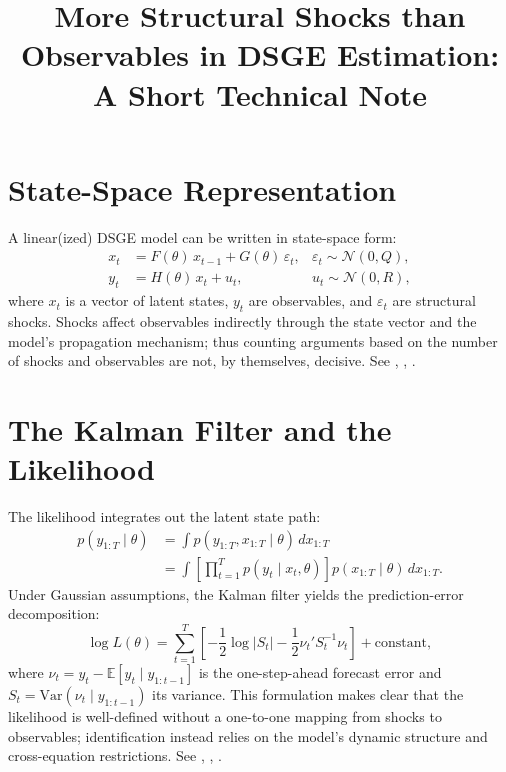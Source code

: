 \documentclass[11pt]{article}
\title{More Structural Shocks than Observables in DSGE Estimation: A Short Technical Note}
\author{}
\date{}
\begin{document}
\maketitle

\section{State-Space Representation}

A linear(ized) DSGE model can be written in state-space form:
\begin{align}
x_t &= F(\theta)\, x_{t-1} + G(\theta)\, \varepsilon_t, 
& \varepsilon_t \sim \mathcal{N}(0,Q), \label{eq:transition}\\
y_t &= H(\theta)\, x_t + u_t,
& u_t \sim \mathcal{N}(0,R), \label{eq:measurement}
\end{align}
where $x_t$ is a vector of latent states, $y_t$ are observables, and $\varepsilon_t$ are structural shocks.
Shocks affect observables indirectly through the state vector and the model's propagation mechanism; thus counting
arguments based on the number of shocks and observables are not, by themselves, decisive. See \citet{an2007},
\citet{herbst2015}, \citet{durbin2012}.

\section{The Kalman Filter and the Likelihood}

The likelihood integrates out the latent state path:
\begin{align}
p(y_{1:T}\mid \theta)
&= \int p(y_{1:T},x_{1:T}\mid \theta)\, dx_{1:T} \nonumber\\
&= \int \left[\prod_{t=1}^T p(y_t\mid x_t,\theta)\right] p(x_{1:T}\mid \theta)\, dx_{1:T}. \label{eq:likelihood_integral}
\end{align}
Under Gaussian assumptions, the Kalman filter yields the prediction-error decomposition:
\begin{equation}
\log L(\theta)
= \sum_{t=1}^{T} \left[
-\frac{1}{2}\log|S_t|
-\frac{1}{2}\nu_t' S_t^{-1}\nu_t
\right] + \text{constant}, \label{eq:kalman_ll}
\end{equation}
where $\nu_t = y_t - \mathbb{E}[y_t \mid y_{1:t-1}]$ is the one-step-ahead forecast error and
$S_t = \text{Var}(\nu_t \mid y_{1:t-1})$ its variance. This formulation makes clear that the likelihood is well-defined without a
one-to-one mapping from shocks to observables; identification instead relies on the model's dynamic structure and
cross-equation restrictions. See \citet{durbin2012}, \citet{hamilton1994}, \citet{an2007}.
\end{document}

